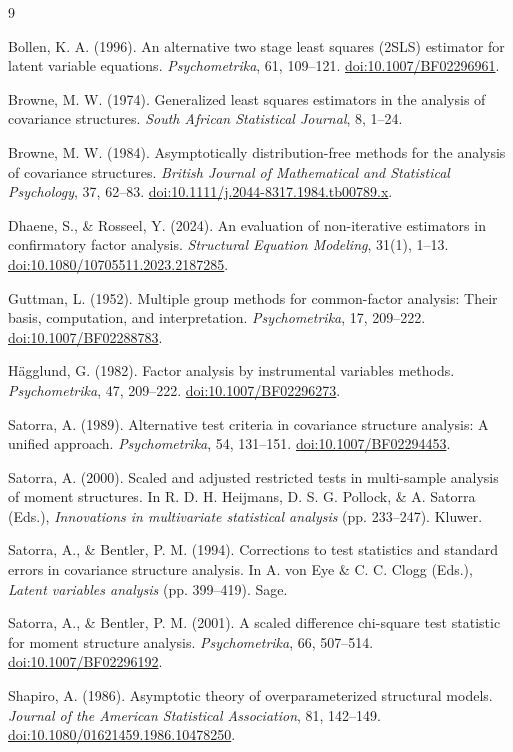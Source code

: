 \documentclass[11pt]{article}
\theoremstyle{plain}
\theoremstyle{definition}
\theoremstyle{remark}
\begin{document}
\begin{thebibliography}{9}

Bollen, K. A. (1996).
An alternative two stage least squares (2SLS) estimator for latent variable
equations.
\emph{Psychometrika}, 61, 109--121.
\href{https://doi.org/10.1007/BF02296961}{doi:10.1007/BF02296961}.

Browne, M. W. (1974).
Generalized least squares estimators in the analysis of covariance structures.
\emph{South African Statistical Journal}, 8, 1--24.

Browne, M. W. (1984).
Asymptotically distribution-free methods for the analysis of covariance
structures.
\emph{British Journal of Mathematical and Statistical Psychology}, 37, 62--83.
\href{https://doi.org/10.1111/j.2044-8317.1984.tb00789.x}
{doi:10.1111/j.2044-8317.1984.tb00789.x}.

Dhaene, S., \& Rosseel, Y. (2024).
An evaluation of non-iterative estimators in confirmatory factor analysis.
\emph{Structural Equation Modeling}, 31(1), 1--13.
\href{https://doi.org/10.1080/10705511.2023.2187285}
{doi:10.1080/10705511.2023.2187285}.

Guttman, L. (1952).
Multiple group methods for common-factor analysis: Their basis, computation, and
interpretation.
\emph{Psychometrika}, 17, 209--222.
\href{https://doi.org/10.1007/BF02288783}{doi:10.1007/BF02288783}.

H\"agglund, G. (1982).
Factor analysis by instrumental variables methods.
\emph{Psychometrika}, 47, 209--222.
\href{https://doi.org/10.1007/BF02296273}{doi:10.1007/BF02296273}.

Satorra, A. (1989).
Alternative test criteria in covariance structure analysis: A unified approach.
\emph{Psychometrika}, 54, 131--151.
\href{https://doi.org/10.1007/BF02294453}{doi:10.1007/BF02294453}.

Satorra, A. (2000).
Scaled and adjusted restricted tests in multi-sample analysis of moment
structures.
In R. D. H. Heijmans, D. S. G. Pollock, \& A. Satorra (Eds.),
\emph{Innovations in multivariate statistical analysis} (pp. 233--247). Kluwer.

Satorra, A., \& Bentler, P. M. (1994).
Corrections to test statistics and standard errors in covariance structure
analysis.
In A. von Eye \& C. C. Clogg (Eds.),
\emph{Latent variables analysis} (pp. 399--419). Sage.

Satorra, A., \& Bentler, P. M. (2001).
A scaled difference chi-square test statistic for moment structure analysis.
\emph{Psychometrika}, 66, 507--514.
\href{https://doi.org/10.1007/BF02296192}{doi:10.1007/BF02296192}.

Shapiro, A. (1986).
Asymptotic theory of overparameterized structural models.
\emph{Journal of the American Statistical Association}, 81, 142--149.
\href{https://doi.org/10.1080/01621459.1986.10478250}
{doi:10.1080/01621459.1986.10478250}.

\end{thebibliography}
\end{document}
